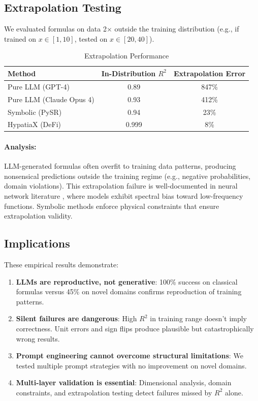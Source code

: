 \documentclass[twoside,11pt]{article}
\begin{document}
\subsection{Extrapolation Testing}

We evaluated formulas on data 2$\times$ outside the training distribution (e.g., if trained on $x \in [1, 10]$, tested on $x \in [20, 40]$).

\begin{table}[htbp]
\centering
\caption{Extrapolation Performance}
\label{tab:extrapolation}
\begin{tabular}{@{}lcc@{}}
\toprule
\textbf{Method} & \textbf{In-Distribution $R^2$} & \textbf{Extrapolation Error} \\
\midrule
Pure LLM (GPT-4) & 0.89 & 847\% \\
Pure LLM (Claude Opus 4) & 0.93 & 412\% \\
\midrule
Symbolic (PySR) & 0.94 & 23\% \\
HypatiaX (DeFi) & 0.999 & 8\% \\
\bottomrule
\end{tabular}
\end{table}

\paragraph{Analysis:} LLM-generated formulas often overfit to training data patterns, producing nonsensical predictions outside the training regime (e.g., negative probabilities, domain violations). This extrapolation failure is well-documented in neural network literature \citep{zhang2024extrapolation}, where models exhibit spectral bias toward low-frequency functions. Symbolic methods enforce physical constraints that ensure extrapolation validity.

\subsection{Implications}

These empirical results demonstrate:

\begin{enumerate}
\item \textbf{LLMs are reproductive, not generative}: 100\% success on classical formulas versus 45\% on novel domains confirms reproduction of training patterns.

\item \textbf{Silent failures are dangerous}: High $R^2$ in training range doesn't imply correctness. Unit errors and sign flips produce plausible but catastrophically wrong results.

\item \textbf{Prompt engineering cannot overcome structural limitations}: We tested multiple prompt strategies with no improvement on novel domains.

\item \textbf{Multi-layer validation is essential}: Dimensional analysis, domain constraints, and extrapolation testing detect failures missed by $R^2$ alone.
\end{enumerate}
\end{document}
